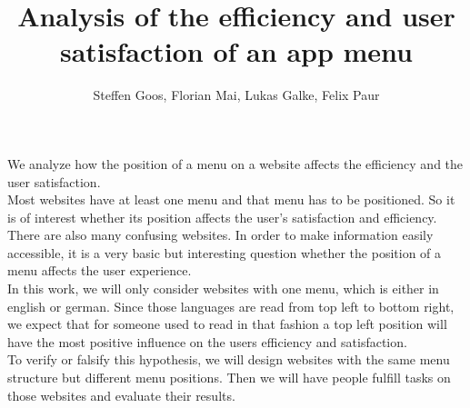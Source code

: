 \documentclass[a4paper]{article}
\author{Steffen Goos, Florian Mai, Lukas Galke, Felix Paur}
\title{Analysis of the efficiency and user satisfaction of an app menu}
\begin{document}
\maketitle
We analyze how the position of a menu on a website affects the efficiency and the user satisfaction.\\
Most websites have at least one menu and that menu has to be positioned.
So it is of interest whether its position affects the user's satisfaction and efficiency.
There are also many confusing websites.
In order to make information easily accessible, it is a very basic but interesting question
whether the position of a menu affects the user experience.\\
In this work, we will only consider websites with one menu,  which is either in english or german.
Since those languages are read from top left to bottom right,
we expect that for someone used to read in that fashion a top left position will have the most positive influence
on the users efficiency and satisfaction.\\
To verify or falsify this hypothesis,  we will design websites with the same menu structure but different menu positions.
Then we will have people fulfill tasks on those websites and evaluate their results.
\end{document}
